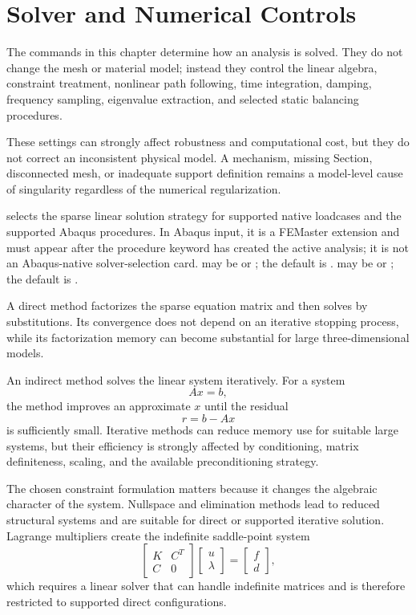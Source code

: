 \chapter{Solver and Numerical Controls}
\label{chap:numerical-controls}

The commands in this chapter determine how an analysis is solved. They do not change the mesh or material model; instead they control the linear algebra, constraint treatment, nonlinear path following, time integration, damping, frequency sampling, eigenvalue extraction, and selected static balancing procedures.

These settings can strongly affect robustness and computational cost, but they do not correct an inconsistent physical model. A mechanism, missing Section, disconnected mesh, or inadequate support definition remains a model-level cause of singularity regardless of the numerical regularization.


 selects the sparse linear solution strategy for supported native loadcases and the supported Abaqus  procedures. In Abaqus input, it is a FEMaster extension and must appear after the procedure keyword has created the active analysis; it is not an Abaqus-native solver-selection card.  may be  or ; the default is .  may be  or ; the default is .

A direct method factorizes the sparse equation matrix and then solves by substitutions. Its convergence does not depend on an iterative stopping process, while its factorization memory can become substantial for large three-dimensional models.

An indirect method solves the linear system iteratively. For a system
\[
A x=b,
\]
the method improves an approximate \(x\) until the residual
\[
r=b-Ax
\]
is sufficiently small. Iterative methods can reduce memory use for suitable large systems, but their efficiency is strongly affected by conditioning, matrix definiteness, scaling, and the available preconditioning strategy.

The chosen constraint formulation matters because it changes the algebraic character of the system. Nullspace and elimination methods lead to reduced structural systems and are suitable for direct or supported iterative solution. Lagrange multipliers create the indefinite saddle-point system
\[
\begin{bmatrix}
K&C^T\\
C&0
\end{bmatrix}
\begin{bmatrix}u\\\lambda\end{bmatrix}
=
\begin{bmatrix}f\\d\end{bmatrix},
\]
which requires a linear solver that can handle indefinite matrices and is therefore restricted to supported direct configurations.

